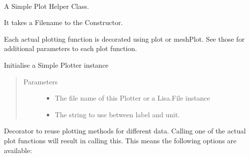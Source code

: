 \documentclass[letterpaper,10pt,openany,oneside,english]{sphinxmanual}
\begin{document}

\begin{fulllineitems}
\label{\detokenize{plots:plots.SimplePlotter}}~
\begin{DUlineblock}{0em}
\item[] A Simple Plot Helper Class.  
\item[] It takes a Filename to the Constructor.  
\item[] Each actual plotting function is decorated using plot or meshPlot. See those for additional parameters to each plot function.  
\end{DUlineblock}

\begin{fulllineitems}
\label{\detokenize{plots:plots.SimplePlotter.__init__}}
Initialise a Simple Plotter instance
\begin{quote}\begin{description}
\item[{Parameters}] \leavevmode\begin{itemize}
\item {} 
 \textendash{} The file name of this Plotter or a Lisa.File instance

\item {} 
 \textendash{} The string to use between label and unit.

\end{itemize}

\end{description}\end{quote}

\end{fulllineitems}


\begin{fulllineitems}
\label{\detokenize{plots:plots.SimplePlotter.plot}}
Decorator to reuse plotting methods for different data. Calling one of the actual plot functions will result in calling this.  
This means the following options are available:


\end{fulllineitems}
\end{fulllineitems}
\end{document}
